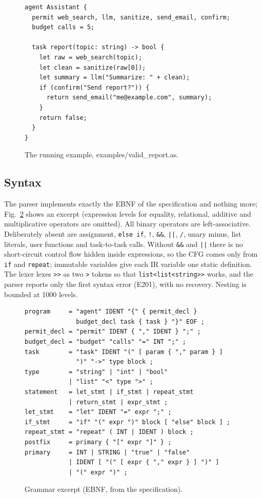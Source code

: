 \documentclass[conference]{IEEEtran}
\begin{document}
\begin{figure}[!htb]
\begin{lstlisting}
agent Assistant {
  permit web_search, llm, sanitize, send_email, confirm;
  budget calls = 5;

  task report(topic: string) -> bool {
    let raw = web_search(topic);
    let clean = sanitize(raw[0]);
    let summary = llm("Summarize: " + clean);
    if (confirm("Send report?")) {
      return send_email("me@example.com", summary);
    }
    return false;
  }
}
\end{lstlisting}
\caption{The running example, examples/valid\_report.as.}
\label{fig:source}
\end{figure}

\subsection{Syntax}
The parser implements exactly the EBNF of the specification and nothing more; Fig.~\ref{fig:grammar} shows an excerpt (expression levels for equality, relational, additive and multiplicative operators are omitted). All binary operators are left-associative. Deliberately absent are assignment, \texttt{else if}, \texttt{!}, \texttt{\&\&}, \texttt{||}, \texttt{/\allowbreak{}}, unary minus, list literals, user functions and task-to-task calls. Without \texttt{\&\&} and \texttt{||} there is no short-circuit control flow hidden inside expressions, so the CFG comes only from \texttt{if} and \texttt{repeat}; immutable variables give each IR variable one static definition. The lexer lexes \texttt{\textgreater{}\textgreater{}} as two \texttt{\textgreater{}} tokens so that \texttt{list\textless{}list\textless{}string\textgreater{}\textgreater{}} works, and the parser reports only the first syntax error (E201), with no recovery. Nesting is bounded at 1000 levels.

\begin{figure}[!htb]
\begin{lstlisting}
program     = "agent" IDENT "{" { permit_decl }
              budget_decl task { task } "}" EOF ;
permit_decl = "permit" IDENT { "," IDENT } ";" ;
budget_decl = "budget" "calls" "=" INT ";" ;
task        = "task" IDENT "(" [ param { "," param } ]
              ")" "->" type block ;
type        = "string" | "int" | "bool"
            | "list" "<" type ">" ;
statement   = let_stmt | if_stmt | repeat_stmt
            | return_stmt | expr_stmt ;
let_stmt    = "let" IDENT "=" expr ";" ;
if_stmt     = "if" "(" expr ")" block [ "else" block ] ;
repeat_stmt = "repeat" ( INT | IDENT ) block ;
postfix     = primary { "[" expr "]" } ;
primary     = INT | STRING | "true" | "false"
            | IDENT [ "(" [ expr { "," expr } ] ")" ]
            | "(" expr ")" ;
\end{lstlisting}
\caption{Grammar excerpt (EBNF, from the specification).}
\label{fig:grammar}
\end{figure}
\end{document}
